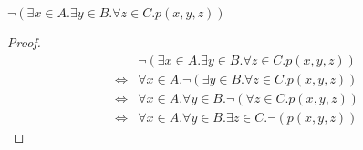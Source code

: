 \begin{example}
    $\neg (\exists x \in A. \exists y \in B. \forall z \in C. p(x, y, z))$
\end{example}

\begin{proof}
    \begin{equation}
        \begin{split}
            & \neg (\exists x \in A. \exists y \in B. \forall z \in C. p(x, y, z)) \\
            \iff & \forall x \in A. \neg (\exists y \in B. \forall z \in C. p(x, y, z)) \\
            \iff & \forall x \in A. \forall y \in B. \neg (\forall z \in C. p(x, y, z)) \\
            \iff & \forall x \in A. \forall y \in B. \exists z \in C. \neg (p(x, y, z)) 
        \end{split}
    \end{equation}
\end{proof}


\newpage